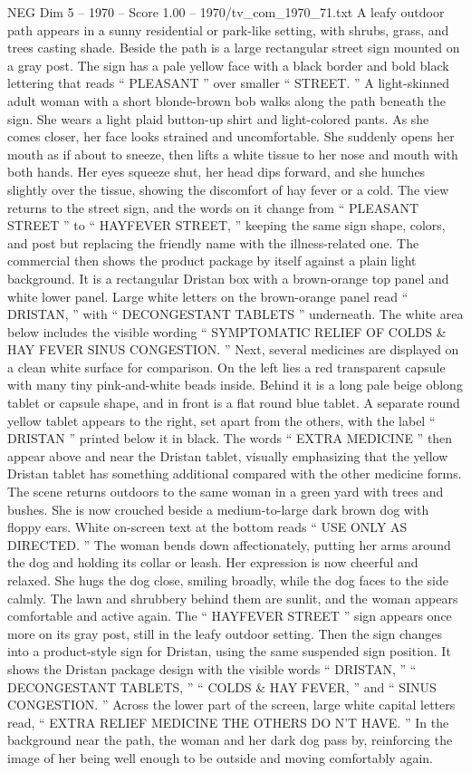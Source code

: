 \begin{textsample}{NEG Dim 5 – 1970 – Score 1.00 – 1970/tv\_com\_1970\_71.txt}  \label{ex:f5_neg_020}
A leafy outdoor path appears in a sunny residential or park-like setting, with shrubs, grass, and trees casting shade.
Beside the path is a large rectangular street sign mounted on a gray post.
The sign has a pale yellow face with a black border and bold black lettering that reads “ PLEASANT ” over smaller “ STREET. ” A light-skinned adult woman with a short blonde-brown bob walks along the path beneath the sign.
She wears a light plaid button-up shirt and light-colored pants.
As she comes closer, her face looks strained and uncomfortable.
She suddenly opens her mouth as if about to sneeze, then lifts a white tissue to her nose and mouth with both hands.
Her eyes squeeze shut, her head dips forward, and she hunches slightly over the tissue, showing the discomfort of hay fever or a cold.
The view returns to the street sign, and the words on it change from “ PLEASANT STREET ” to “ HAYFEVER STREET, ” keeping the same sign shape, colors, and post but replacing the friendly name with the illness-related one.
The commercial then shows the product package by itself against a plain light background.
It is a rectangular Dristan box with a brown-orange top panel and white lower panel.
Large white letters on the brown-orange panel read “ DRISTAN, ” with “ DECONGESTANT TABLETS ” underneath.
The white area below includes the visible wording “ SYMPTOMATIC RELIEF OF COLDS \& HAY FEVER SINUS CONGESTION. ” Next, several medicines are displayed on a clean white surface for comparison.
On the left lies a red transparent capsule with many tiny pink-and-white beads inside.
Behind it is a long pale beige oblong tablet or capsule shape, and in front is a flat round blue tablet.
A separate round yellow tablet appears to the right, set apart from the others, with the label “ DRISTAN ” printed below it in black.
The words “ EXTRA MEDICINE ” then appear above and near the Dristan tablet, visually emphasizing that the yellow Dristan tablet has something additional compared with the other medicine forms.
The scene returns outdoors to the same woman in a green yard with trees and bushes.
She is now crouched beside a medium-to-large dark brown dog with floppy ears.
White on-screen text at the bottom reads “ USE ONLY AS DIRECTED. ” The woman bends down affectionately, putting her arms around the dog and holding its collar or leash.
Her expression is now cheerful and relaxed.
She hugs the dog close, smiling broadly, while the dog faces to the side calmly.
The lawn and shrubbery behind them are sunlit, and the woman appears comfortable and active again.
The “ HAYFEVER STREET ” sign appears once more on its gray post, still in the leafy outdoor setting.
Then the sign changes into a product-style sign for Dristan, using the same suspended sign position.
It shows the Dristan package design with the visible words “ DRISTAN, ” “ DECONGESTANT TABLETS, ” “ COLDS \& HAY FEVER, ” and “ SINUS CONGESTION. ” Across the lower part of the screen, large white capital letters read, “ EXTRA RELIEF MEDICINE THE OTHERS DO N’T HAVE. ” In the background near the path, the woman and her dark dog pass by, reinforcing the image of her being well enough to be outside and moving comfortably again.

\end{textsample}
